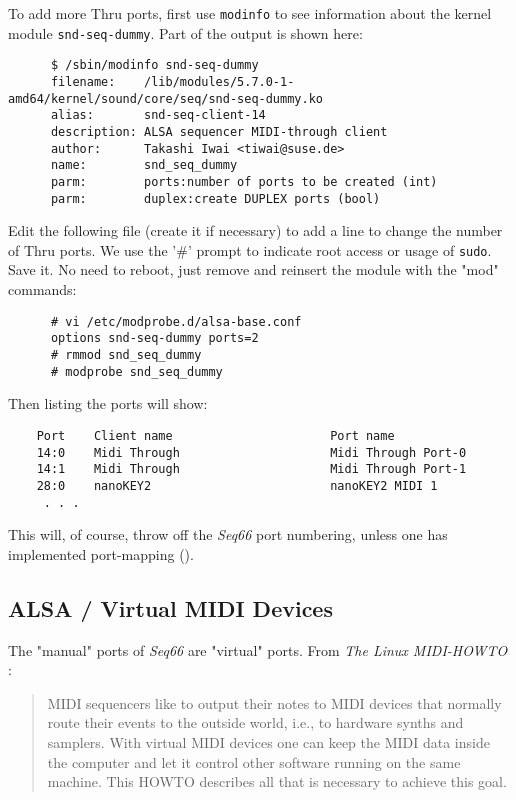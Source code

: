    To add more Thru ports, first use \texttt{modinfo} to see information about
   the kernel module \texttt{snd-seq-dummy}.  Part of the output is shown here:

   \begin{verbatim}
      $ /sbin/modinfo snd-seq-dummy
      filename:    /lib/modules/5.7.0-1-amd64/kernel/sound/core/seq/snd-seq-dummy.ko
      alias:       snd-seq-client-14
      description: ALSA sequencer MIDI-through client
      author:      Takashi Iwai <tiwai@suse.de>
      name:        snd_seq_dummy
      parm:        ports:number of ports to be created (int)
      parm:        duplex:create DUPLEX ports (bool)
   \end{verbatim}

   Edit the following file (create it if necessary)
   to add a line to change the number
   of Thru ports.  We use the '\#' prompt to indicate root access or usage of
   \texttt{sudo}.
   Save it.  No need to reboot, just remove and reinsert the module with the
   "mod" commands:

   \begin{verbatim}
      # vi /etc/modprobe.d/alsa-base.conf
      options snd-seq-dummy ports=2
      # rmmod snd_seq_dummy
      # modprobe snd_seq_dummy
   \end{verbatim}

   Then listing the ports will show:

   \begin{verbatim}
    Port    Client name                      Port name
    14:0    Midi Through                     Midi Through Port-0
    14:1    Midi Through                     Midi Through Port-1
    28:0    nanoKEY2                         nanoKEY2 MIDI 1
     . . .
   \end{verbatim}

   This will, of course, throw off the \textsl{Seq66} port numbering, unless
   one has implemented port-mapping ().

\subsection{ALSA / Virtual MIDI Devices}
\label{subsec:alsa_virtual_midi_devices}

   The "manual" ports of \textsl{Seq66} are "virtual" ports.
   From \textsl{The Linux MIDI-HOWTO} \cite{midihowto}:

   \begin{quote}
   MIDI sequencers like to output their notes to MIDI devices that normally
   route their events to the outside world, i.e., to hardware synths and
   samplers. With virtual MIDI devices one can keep the MIDI data inside the
   computer and let it control other software running on the same machine. This
   HOWTO describes all that is necessary to achieve this goal.
   \end{quote}

